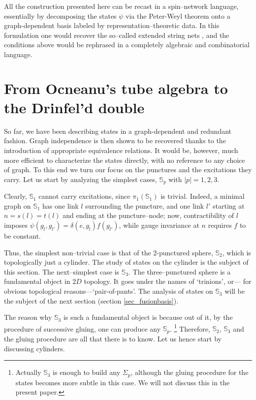 \documentclass[nofootinbib,superscriptaddress,eqsecnum,tightenlines,11pt]{revtex4-1}
\renewcommand{\S}{{\mathbb S}}
\begin{document}
All the construction presented here can be recast in a spin--network language, essentially by decomposing the states $\psi$ via the Peter-Weyl theorem onto a graph-dependent basis labeled by representation--theoretic data. 
In this formulation one would recover the so--called extended string nets \cite{Buersch}, and the conditions above would be rephrased in a completely algebraic and combinatorial language.


\section{From Ocneanu's tube algebra to the Drinfel'd double\label{sec_drinfeld}}

So far, we have been describing states in a graph-dependent and redundant fashion.
Graph independence is then shown to be recovered thanks to the introduction of appropriate equivalence relations.
It would be, however, much more efficient to characterize the states directly, with no reference to any choice of graph.
To this end we turn our focus on the punctures and the excitations they carry.
Let us start by analyzing the simplest cases, $\S_p$ with $|p|=1,2,3$.

Clearly, $\S_1$ cannot carry excitations, since $\pi_1(\S_1)$ is trivial.
Indeed, a minimal graph on $\S_1$ has one link $l$ surrounding the puncture, and one link $l'$ starting at $n=s(l)=t(l)$ and ending at the puncture--node; 
now, contractibility of $l$ imposes $\psi(g_l,g_{l'}) = \delta(e, g_l) f(g_{l'})$, while gauge invariance at $n$ requires $f$ to be constant.

Thus, the simplest non--trivial case is that of the 2-punctured sphere, $\S_2$, which is topologically just a cylinder. 
The study of states on the cylinder is the subject of this section.
The next--simplest case is $\S_3$. 
The three--punctured sphere is a fundamental object in $2D$ topology.
It goes under the names of `trinions', or--- for obvious topological reasons---`pair-of-pants'.
The analysis of states on $\S_3$ will be the subject of the next section (section \ref{sec_fusionbasis}).

The reason why $\S_3$ is such a fundamental object is because out of it, by the procedure of successive gluing, one can produce any $\S_p$.%
\footnote{ Actually $\S_3$ is enough to build any $\Sigma_p$, although the gluing procedure for the states becomes  more subtle in this case. We will not discuss this in the present paper.}
Therefore, $\S_2$, $\S_3$ and the gluing procedure are all that there is to know.
Let us hence start by discussing cylinders.
\end{document}
